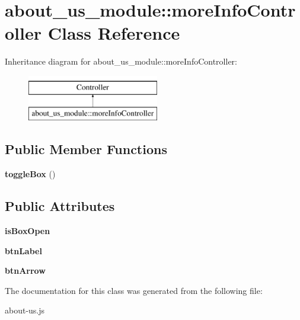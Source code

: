 \hypertarget{classabout__us__module_1_1moreInfoController}{\section{about\-\_\-us\-\_\-module\-:\-:more\-Info\-Controller Class Reference}
\label{classabout__us__module_1_1moreInfoController}
}
Inheritance diagram for about\-\_\-us\-\_\-module\-:\-:more\-Info\-Controller\-:\begin{figure}[H]
\begin{center}
\leavevmode
\includegraphics[height=2.000000cm]{classabout__us__module_1_1moreInfoController}
\end{center}
\end{figure}
\subsection*{Public Member Functions}
\begin{DoxyCompactItemize}
\item 
\hypertarget{classabout__us__module_1_1moreInfoController_a316ace3a6be8c89e097d7459224f213d}{{\bfseries toggle\-Box} ()}\label{classabout__us__module_1_1moreInfoController_a316ace3a6be8c89e097d7459224f213d}

\end{DoxyCompactItemize}
\subsection*{Public Attributes}
\begin{DoxyCompactItemize}
\item 
\hypertarget{classabout__us__module_1_1moreInfoController_affa9bd2cbbc263c93ee00ec40e1051c9}{{\bfseries is\-Box\-Open}}\label{classabout__us__module_1_1moreInfoController_affa9bd2cbbc263c93ee00ec40e1051c9}

\item 
\hypertarget{classabout__us__module_1_1moreInfoController_a27d5952fdc112f5fbab63c461955e755}{{\bfseries btn\-Label}}\label{classabout__us__module_1_1moreInfoController_a27d5952fdc112f5fbab63c461955e755}

\item 
\hypertarget{classabout__us__module_1_1moreInfoController_acfa0d4f04df2f8c6006108c6a1e7d631}{{\bfseries btn\-Arrow}}\label{classabout__us__module_1_1moreInfoController_acfa0d4f04df2f8c6006108c6a1e7d631}

\end{DoxyCompactItemize}


The documentation for this class was generated from the following file\-:\begin{DoxyCompactItemize}
\item 
about-\/us.\-js\end{DoxyCompactItemize}
